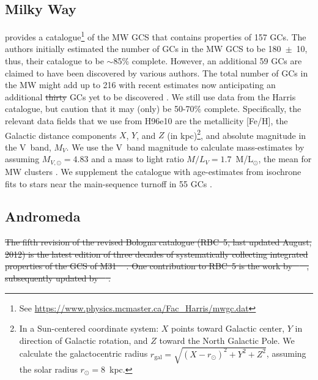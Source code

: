 \documentclass[a4paper,fleqn,usenatbib]{mnras}
\providecommand{\DIFadd}[1]{{\protect\color{blue}\uwave{#1}}} %
\providecommand{\DIFdel}[1]{{\protect\color{red}\sout{#1}}}                      %
\providecommand{\DIFaddbegin}{} %
\providecommand{\DIFaddend}{} %
\providecommand{\DIFdelbegin}{} %
\providecommand{\DIFdelend}{} %
\newcommand{\DIFscaledelfig}{0.5}
\newlength{\DIFdelgraphicswidth} %
\newlength{\DIFdelgraphicsheight} %
\newcommand{\DIFaddincludegraphics}[2][]{{\color{blue}\fbox{\DIFOincludegraphics[#1]{#2}}}} %
\newcommand{\DIFdelincludegraphics}[2][]{%
\sbox{\DIFdelgraphicsbox}{\DIFOincludegraphics[#1]{#2}}%
\settoboxwidth{\DIFdelgraphicswidth}{\DIFdelgraphicsbox} %
\settoboxtotalheight{\DIFdelgraphicsheight}{\DIFdelgraphicsbox} %
\scalebox{\DIFscaledelfig}{%
\parbox[b]{\DIFdelgraphicswidth}{\usebox{\DIFdelgraphicsbox}\\[-\baselineskip] \rule{\DIFdelgraphicswidth}{0em}}\llap{\resizebox{\DIFdelgraphicswidth}{\DIFdelgraphicsheight}{%
\setlength{\unitlength}{\DIFdelgraphicswidth}%
\begin{picture}(1,1)%
\thicklines\linethickness{2pt} %
{\color[rgb]{1,0,0}\put(0,0){\framebox(1,1){}}}%
{\color[rgb]{1,0,0}\put(0,0){\line( 1,1){1}}}%
{\color[rgb]{1,0,0}\put(0,1){\line(1,-1){1}}}%
\end{picture}%
}\hspace*{3pt}}} %
} %
\DeclareRobustCommand{\DIFaddbegin}{\DIFOaddbegin \let\includegraphics\DIFaddincludegraphics} %
\DeclareRobustCommand{\DIFaddend}{\DIFOaddend \let\includegraphics\DIFOincludegraphics} %
\DeclareRobustCommand{\DIFdelbegin}{\DIFOdelbegin \let\includegraphics\DIFdelincludegraphics} %
\DeclareRobustCommand{\DIFdelend}{\DIFOaddend \let\includegraphics\DIFOincludegraphics} %
\begin{document}
\subsection{Milky Way}
\label{sec:milkyway}
\citet[][2010 edition; hereafter H96e10]{1996AJ....112.1487H} provides a
catalogue\footnote{See \url{https://www.physics.mcmaster.ca/Fac_Harris/mwgc.dat}}
of the MW GCS that contains properties of 157 GCs. 
The authors initially estimated the number of GCs in the MW GCS to be 180~$\pm$~10,
thus, their catalogue to be ${\sim}$85\% complete. However, an additional 59 GCs
are claimed to have been discovered by various authors. The total number of GCs
in the MW might add up to 216 with recent estimates now anticipating an additional 
\DIFdelbegin \DIFdel{thirty }\DIFdelend \DIFaddbegin \DIFadd{$30$~}\DIFaddend GCs yet to be discovered \citep[e.g.][and references therein]{2018ApJ...863L..38R}.
We still use data from the Harris catalogue, but caution that it may (only) be
50-70\% complete. Specifically, the relevant data fields that we use from H96e10
are the metallicity [Fe/H], the Galactic distance components $X$, $Y$, and $Z$ (in
kpc)\footnote{In a Sun-centered coordinate system: $X$ points toward Galactic
center, $Y$ in direction of Galactic rotation, and $Z$ toward the North Galactic
Pole. We calculate the galactocentric radius $r_{\text{gal}}=\sqrt{(X-r_\odot)^2
+ Y^2 + Z^2}$, assuming the solar radius $r_\odot=8$~kpc.}, and absolute
magnitude in the V~band, $M_V$. We use the V~band magnitude to calculate 
mass-estimates by assuming $M_{V,\odot}=4.83$ and a mass to light ratio 
$M/L_V = 1.7$~M\DIFaddbegin \DIFadd{$_{\odot}$}\DIFaddend /L$_{\odot}$, the mean for MW clusters \citep{2005ApJS..161..304M}. 
We supplement the catalogue with age-estimates from isochrone fits to stars near 
the main-sequence turnoff in 55 GCs \citep[][hereafter V13]{2013ApJ...775..134V}.


\subsection{Andromeda}
\label{sec:andromeda}
\DIFdelbegin \DIFdel{The fifth revision of the revised Bologna catalogue (RBC~5, last updated
August, 2012) is the latest edition of three decades of systematically
collecting integrated properties of the GCS of M31 \mbox{%
\citep[][and references therein]{2004A&A...416..917G}}\hspace{0pt}%
. One
contribution to RBC~5 is the work by \mbox{%
\citet[][hereafter C11]{2011AJ....141...61C} }\hspace{0pt}%
,
subsequently updated by \mbox{%
\citet[][hereafter CR16]{2016ApJ...824...42C}}\hspace{0pt}%
.
}%
\end{document}

